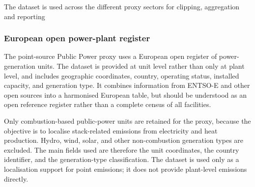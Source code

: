 The dataset is used across the different proxy sectors for clipping, aggregation and reporting



\subsubsection*{European open power-plant register}
\label{app:powerplant_register}

The point-source Public Power proxy uses a European open register of
power-generation units. The dataset is provided at unit level rather than only
at plant level, and includes geographic coordinates, country, operating
status, installed capacity, and generation type. It combines information from
ENTSO-E and other open sources into a harmonised European table, but should be
understood as an open reference register rather than a complete census of all
facilities.

Only combustion-based public-power units are retained for the proxy, because
the objective is to localise stack-related emissions from electricity and heat
production. Hydro, wind, solar, and other non-combustion generation types are
excluded. The main fields used are therefore the unit coordinates, the country
identifier, and the generation-type classification. The dataset is used only
as a localisation support for point emissions; it does not provide plant-level
emissions directly.

